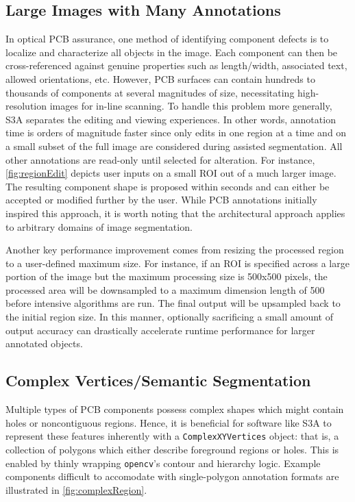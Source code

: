 \subsection{Large Images with Many Annotations}
In optical PCB assurance, one method of identifying component defects is to localize and characterize all objects in the image.
Each component can then be cross-referenced against genuine properties such as length/width, associated text, allowed orientations, etc.
However, PCB surfaces can contain hundreds to thousands of components at several magnitudes of size, necessitating high-resolution images for in-line scanning.
To handle this problem more generally, S3A separates the editing and viewing experiences.
In other words, annotation time is orders of magnitude faster since only edits in one region at a time and on a small subset of the full image are considered during assisted segmentation.
All other annotations are read-only until selected for alteration.
For instance, \autoref{fig:regionEdit} depicts user inputs on a small ROI out of a much larger image.
The resulting component shape is proposed within seconds and can either be accepted or modified further by the user.
While PCB annotations initially inspired this approach, it is worth noting that the architectural approach applies to arbitrary domains of image segmentation.

Another key performance improvement comes from resizing the processed region to a user-defined maximum size.
For instance, if an ROI is specified across a large portion of the image but the maximum processing size is 500x500 pixels, the processed area will be downsampled to a maximum dimension length of 500 before intensive algorithms are run.
The final output will be upsampled back to the initial region size.
In this manner, optionally sacrificing a small amount of output accuracy can drastically accelerate runtime performance for larger annotated objects.

\makeRegionEditFig

\subsection{Complex Vertices/Semantic Segmentation}
Multiple types of PCB components possess complex shapes which might contain holes or noncontiguous regions.
Hence, it is beneficial for software like S3A to represent these features inherently with a \texttt{ComplexXYVertices} object: that is, a collection of polygons which either describe foreground regions or holes.
This is enabled by thinly wrapping \texttt{opencv}'s contour and hierarchy logic.
Example components difficult to accomodate with single-polygon annotation formats are illustrated in \autoref{fig:complexRegion}.

